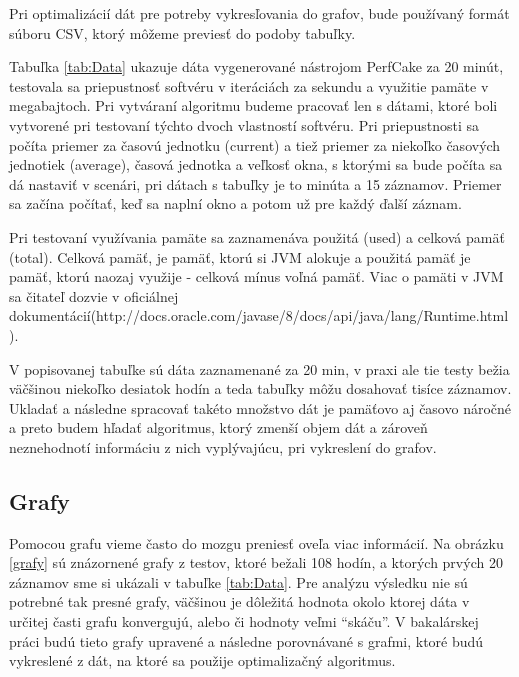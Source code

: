 Pri optimalizácií dát pre potreby vykresľovania do grafov, bude používaný formát súboru CSV, ktorý môžeme previesť do podoby tabuľky.

Tabuľka  \ref{tab:Data} ukazuje dáta vygenerované nástrojom PerfCake za 20 minút, testovala sa priepustnosť softvéru v iteráciách za sekundu a využitie pamäte v megabajtoch. Pri vytváraní algoritmu budeme pracovať len s dátami, ktoré boli vytvorené pri testovaní týchto dvoch vlastností softvéru. Pri priepustnosti sa počíta priemer za časovú jednotku (current) a tiež priemer za niekoľko časových jednotiek (average), časová jednotka a veľkosť okna, s ktorými sa bude počíta sa 
dá nastaviť v scenári, pri dátach s tabuľky je to minúta a 15 záznamov. Priemer sa začína počítať, keď sa naplní okno a potom už pre každý ďalší záznam. 

Pri testovaní využívania pamäte sa zaznamenáva použitá (used) a celková pamäť (total). Celková pamäť, je pamäť, ktorú si  JVM alokuje a použitá pamäť je pamäť, ktorú naozaj využije - celková mínus voľná pamäť. Viac o pamäti v JVM sa čitateľ dozvie v oficiálnej dokumentácií(http://docs.oracle.com/javase/8/docs/api/java/lang/Runtime.html).

V popisovanej tabuľke sú dáta zaznamenané za 20 min, v praxi ale tie testy bežia väčšinou niekoľko desiatok hodín a teda tabuľky môžu dosahovať tisíce záznamov. Ukladať a následne spracovať takéto množstvo dát je pamäťovo aj časovo náročné a preto budem hľadať algoritmus, ktorý zmenší objem dát a zároveň neznehodnotí informáciu z nich vyplývajúcu, pri vykreslení do grafov.


\subsection{Grafy}

Pomocou grafu vieme často do mozgu preniesť oveľa viac informácií. 
Na obrázku  \ref{grafy} sú znázornené grafy z testov, ktoré bežali 108 hodín, a ktorých prvých 20 záznamov sme si ukázali v tabuľke  \ref{tab:Data}. Pre analýzu výsledku nie sú potrebné tak presné grafy, väčšinou je dôležitá hodnota okolo ktorej dáta v určitej časti grafu konvergujú, alebo či hodnoty veľmi ``skáču''. V bakalárskej práci budú tieto grafy upravené a následne porovnávané s grafmi, ktoré budú vykreslené z dát, na ktoré sa použije optimalizačný algoritmus.




